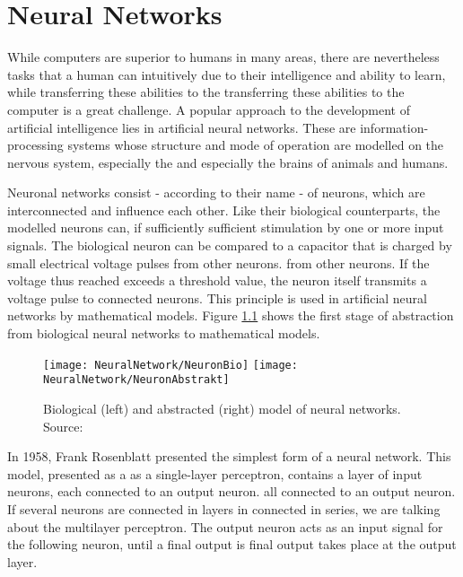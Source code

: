%
%


\chapter{Neural Networks}

While computers are superior to humans in many areas, there are nevertheless tasks that a human can
intuitively due to their intelligence and ability to learn, while transferring these abilities to the 
transferring these abilities to the computer is a great challenge. A popular approach to the development of 
artificial intelligence lies in artificial neural networks. These are 
information-processing systems whose structure and mode of operation are modelled on the nervous system, especially the 
and especially the brains of animals and humans.

Neuronal networks consist - according to their name - of neurons, which are interconnected 
and influence each other. Like their biological counterparts, the modelled neurons can, if sufficiently 
sufficient stimulation by one or more input signals. The biological 
neuron can be compared to a capacitor that is charged by small electrical voltage pulses from other neurons. 
from other neurons. If the voltage thus reached exceeds a threshold value, 
the neuron itself transmits a voltage pulse to connected neurons. This principle is used in 
artificial neural networks by mathematical models. Figure \ref{NNBio} shows 
the first stage of abstraction from biological neural networks to mathematical models. 
\cite{Ertel:2016}

\begin{figure}[H]
	\begin{center}
		\texttt{[image: NeuralNetwork/NeuronBio]}
		\texttt{[image: NeuralNetwork/NeuronAbstrakt]}
		\caption{Biological (left) and abstracted (right) model of neural networks. Source:\cite{Ertel:2016}} 
		\label{NNBio}
	\end{center}
\end{figure}

In 1958, Frank Rosenblatt presented the simplest form of a neural network. This model, presented as a
as a single-layer perceptron, contains a layer of input neurons, each connected to an output neuron.
all connected to an output neuron. \cite{Dorn:2018} If several neurons are connected in layers in 
connected in series, we are talking about the multilayer perceptron. The output
neuron acts as an input signal for the following neuron, until a final output is
final output takes place at the output layer.

